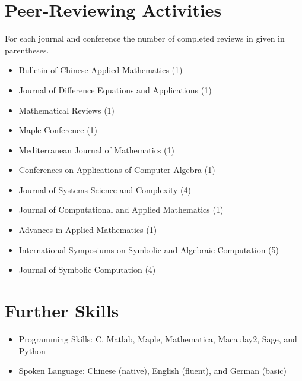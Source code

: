 \documentclass[a4paper,12pt]{article}
\begin{document}
\section*{\Large Peer-Reviewing Activities}
For each journal and conference the number of completed reviews in given in parentheses.
\begin{itemize}
\item Bulletin of Chinese Applied Mathematics (1)
\item Journal of Difference Equations and Applications (1)
\item Mathematical Reviews (1)
\item Maple Conference (1)
\item Mediterranean Journal of Mathematics (1)
\item Conferences on Applications of Computer Algebra (1)
 \item Journal of Systems Science and Complexity (4)
 \item Journal of Computational and Applied Mathematics (1)
 \item Advances in Applied Mathematics (1)
 \item International Symposiums on Symbolic and Algebraic Computation (5)
 \item Journal of Symbolic Computation (4)
\end{itemize}

\section*{\Large{Further Skills}}
\begin{itemize}
 \item Programming Skills: C, Matlab, Maple, Mathematica, Macaulay2, Sage, and Python
 \item Spoken Language: Chinese (native), English (fluent), and German (basic)
\end{itemize}

\end{document}
